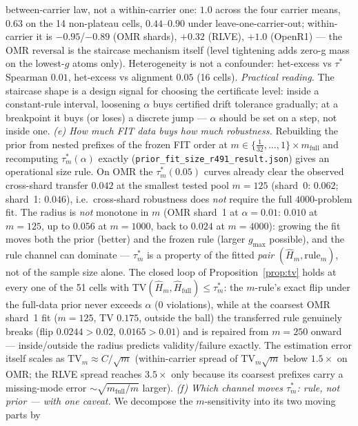 \documentclass{article}
\theoremstyle{definition}
\theoremstyle{remark}
\begin{document}
between-carrier law, not a within-carrier one: $1.0$ across the four
carrier means, $0.63$ on the 14 non-plateau cells, $0.44$--$0.90$ under
leave-one-carrier-out; within-carrier it is $-0.95$/$-0.89$ (OMR shards),
$+0.32$ (RLVE), $+1.0$ (OpenR1) --- the OMR reversal is the staircase
mechanism itself (level tightening adds zero-g mass on the lowest-$g$
atoms only). Heterogeneity is not a confounder: het-excess vs $\tau^*$
Spearman $0.01$, het-excess vs alignment $0.05$ (16 cells).
\emph{Practical reading.} The staircase shape is a design signal for
choosing the certificate level: inside a constant-rule interval,
loosening $\alpha$ buys certified drift tolerance gradually; at a
breakpoint it buys (or loses) a discrete jump --- $\alpha$ should be set
on a step, not inside one.
\emph{(e) How much FIT data buys how much robustness.} Rebuilding the
prior from nested prefixes of the frozen FIT order at
$m\in\{\tfrac{1}{32},\dots,1\}\times m_{\mathrm{full}}$ and recomputing
$\tau^*_m(\alpha)$ exactly
(\texttt{prior\_fit\_size\_r491\_result.json}) gives an operational size
rule. On OMR the $\tau^*_m(0.05)$ curves already clear the observed
cross-shard transfer $0.042$ at the smallest tested pool $m{=}125$
(shard~0: $0.062$; shard~1: $0.046$), i.e.\ cross-shard robustness does
\emph{not} require the full $4000$-problem fit. The radius is
\emph{not} monotone in $m$ (OMR shard~1 at $\alpha=0.01$: $0.010$ at
$m{=}125$, up to $0.056$ at $m{=}1000$, back to $0.024$ at $m{=}4000$):
growing the fit moves both the prior (better) and the frozen rule
(larger $g_{\max}$ possible), and the rule channel can dominate ---
$\tau^*_m$ is a property of the fitted \emph{pair} $(\widehat H_m,
\text{rule}_m)$, not of the sample size alone. The closed loop of
Proposition~\ref{prop:tv} holds at every one of the 51 cells with
$\mathrm{TV}(\widehat H_m,\widehat H_{\mathrm{full}})\le\tau^*_m$: the
$m$-rule's exact flip under the full-data prior never exceeds $\alpha$
(0 violations), while at the coarsest OMR shard~1 fit ($m{=}125$, TV
$0.175$, outside the ball) the transferred rule genuinely breaks
(flip $0.0244>0.02$, $0.0165>0.01$) and is repaired from $m{=}250$
onward --- inside/outside the radius predicts validity/failure exactly.
The estimation error itself scales as $\mathrm{TV}_m\approx C/\sqrt m$
(within-carrier spread of $\mathrm{TV}_m\sqrt m$ below $1.5\times$ on OMR;
the RLVE spread reaches $3.5\times$ only because its coarsest prefixes
carry a missing-mode error $\sim\!\sqrt{m_{\mathrm{full}}/m}$ larger).
\emph{(f) Which channel moves $\tau^*_m$: rule, not prior --- with one
caveat.} We decompose the $m$-sensitivity into its two moving parts by
\end{document}
